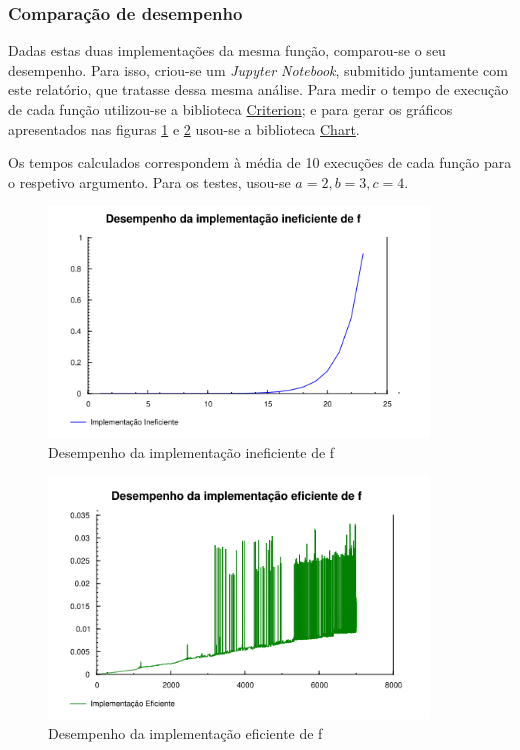 \documentclass[a4paper]{article}
\begin{document}
\subsubsection*{Comparação de desempenho}

Dadas estas duas implementações da mesma função, comparou-se o seu desempenho. Para isso, criou-se um \textit{Jupyter Notebook}, submitido juntamente com este relatório, que tratasse dessa mesma análise. Para medir o tempo de execução de cada função utilizou-se a biblioteca \href{https://hackage.haskell.org/package/criterion}{Criterion}; e para gerar os gráficos apresentados nas figuras \ref{fig:prob1_performance_poor} e \ref{fig:prob1_performance_good} usou-se a biblioteca \href{https://hackage.haskell.org/package/Chart}{Chart}.

Os tempos calculados correspondem à média de 10 execuções de cada função para o respetivo argumento. Para os testes, usou-se $a=2, b=3, c=4$.

\begin{figure}[h!]
  \centering
  \includegraphics[width=0.9\textwidth]{cp2223t_media/fIneficiente.png}
  \caption{Desempenho da implementação ineficiente de f}
  \label{fig:prob1_performance_poor}
\end{figure}

\begin{figure}[h!]
  \centering
  \includegraphics[width=0.9\textwidth]{cp2223t_media/fEficiente.png}
  \caption{Desempenho da implementação eficiente de f}
  \label{fig:prob1_performance_good}
\end{figure}
\end{document}
